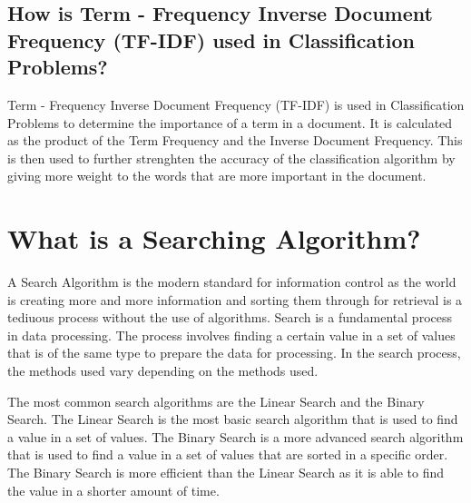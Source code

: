 \documentclass[11pt]{article}
\begin{document}
\begin{multicols*}{2}
    \subsection*{How is Term - Frequency Inverse Document Frequency (TF-IDF) used in Classification Problems?}
    \par Term - Frequency Inverse Document Frequency (TF-IDF) is used in Classification Problems to determine the importance of a term in a document. It is calculated as the product of the Term Frequency and the Inverse Document Frequency. \cite{tf_idf_classification} This is then used to further strenghten the accuracy of the classification algorithm by giving more weight to the words that are more important in the document. \cite{tf_idf_classification}
    \section*{What is a Searching Algorithm?}
    \par A Search Algorithm is the modern standard for information control as the world is creating more and more information and sorting them through for retrieval is a tediuous process without the use of algorithms. Search is a fundamental process in data processing. The process involves finding a certain value in a set of values that is of the same type to prepare the data for processing. In the search process, the methods used vary depending on the methods used.
    \par The most common search algorithms are the Linear Search and the Binary Search. The Linear Search is the most basic search algorithm that is used to find a value in a set of values. The Binary Search is a more advanced search algorithm that is used to find a value in a set of values that are sorted in a specific order. The Binary Search is more efficient than the Linear Search as it is able to find the value in a shorter amount of time.\cite*{sorting_algorithm_comparison}

\end{multicols*}
\end{document}
